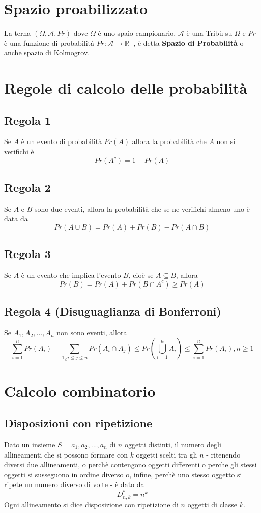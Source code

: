 \documentclass[a4paper]{report}
\begin{document}
  \section{Spazio proabilizzato}
  La terna $(\Omega, \mathcal{A}, Pr)$ dove $\Omega$ è uno spaio campionario, $\mathcal{A}$ è una Tribù su $\Omega$ e $Pr$ è una funzione di probabilità $Pr: \mathcal{A} \longrightarrow \mathbb{R^+}$, è detta \textbf{Spazio di Probabilità} o anche spazio di Kolmogrov.

  \section{Regole di calcolo delle probabilità}
  \subsection{Regola 1}
  Se $A$ è un evento di probabilità $Pr(A)$ allora la probabilità che $A$ non si verifichi è
  \[ Pr(A^c)=1-Pr(A) \]

  \subsection{Regola 2}
  Se $A$ e $B$ sono due eventi, allora la probabilità che se ne verifichi almeno uno è data da
  \[ Pr(A \cup B) = Pr(A) + Pr(B) - Pr(A \cap B) \]

  \subsection{Regola 3}
  Se $A$ è un evento che implica l'evento $B$, cioè se $A \subseteq B$, allora
  \[ Pr(B) = Pr(A) + Pr(B \cap A^c) \geq Pr(A) \]

  \subsection{Regola 4 (Disuguaglianza di Bonferroni)}
  Se $A_1, A_2, ..., A_n$ non sono eventi, allora
  \[ \sum_{i=1}^{n} Pr(A_i) - \sum_{1_\leq i \leq j \leq n} Pr(A_i \cap A_j) \leq Pr(\bigcup\limits_{i=1}^{n} A_i) \leq \sum_{i=1}^{n} Pr(A_i),     n \geq 1 \]

  \section{Calcolo combinatorio}
  \subsection{Disposizioni con ripetizione}
  Dato un insieme $S = {a_1,a_2,...,a_n}$ di $n$ oggetti distinti, il numero degli allineamenti che si possono formare con $k$ oggetti scelti tra gli $n$ - ritenendo diversi due allineamenti, o perchè contengono oggetti differenti o perche gli stessi oggetti si susseguono in ordine diverso o, infine, perchè uno stesso oggetto si ripete un numero diverso di volte - è dato da
  \[ D_{n,k}^* = n^k \]
  Ogni allineamento si dice disposizione con ripetizione di $n$ oggetti di classe $k$.
\end{document}
